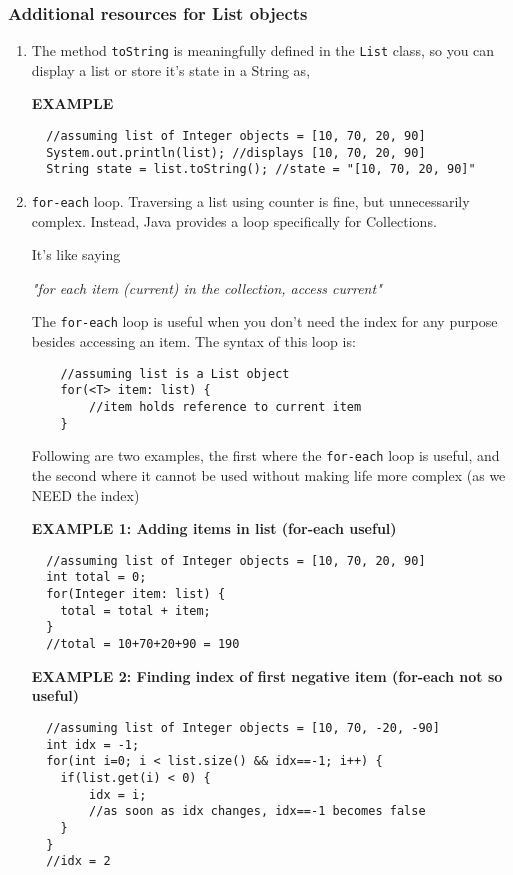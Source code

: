 \subsubsection{Additional resources for List objects}

\begin{enumerate}
\item The method \texttt{toString} is meaningfully defined in the \texttt{List} class, so you can display a list or store it's state in a String as,

    \begin{center} \textbf{EXAMPLE} \end{center}
\begin{lstlisting}
  //assuming list of Integer objects = [10, 70, 20, 90]
  System.out.println(list); //displays [10, 70, 20, 90]
  String state = list.toString(); //state = "[10, 70, 20, 90]"
\end{lstlisting}

\item \texttt{for-each} loop. Traversing a list using counter is fine, but unnecessarily complex. Instead, Java provides a loop specifically for Collections. 

It's like saying 
\begin{center}
\emph{"for each item (current) in the collection, access current"}
\end{center}

The \texttt{for-each} loop is useful when you don't need the index for any purpose besides accessing an item. The syntax of this loop is:

	\begin{lstlisting}
  	//assuming list is a List object
  	for(<T> item: list) {
  		//item holds reference to current item
  	}
	\end{lstlisting}

Following are two examples, the first where the \texttt{for-each} loop is useful, and the second where it cannot be used without making life more complex (as we NEED the index)

    \begin{center} 
    	\textbf{EXAMPLE 1: Adding items in list (for-each useful)}
    \end{center}
\begin{lstlisting}
  //assuming list of Integer objects = [10, 70, 20, 90]
  int total = 0;
  for(Integer item: list) {
  	total = total + item;
  }
  //total = 10+70+20+90 = 190
\end{lstlisting}

    \begin{center} 
    	\textbf{EXAMPLE 2: Finding index of first negative item (for-each not so useful)}
    \end{center}
\begin{lstlisting}
  //assuming list of Integer objects = [10, 70, -20, -90]
  int idx = -1;
  for(int i=0; i < list.size() && idx==-1; i++) {
  	if(list.get(i) < 0) {
  		idx = i;
  		//as soon as idx changes, idx==-1 becomes false
  	}
  }
  //idx = 2
\end{lstlisting}

\end{enumerate}

